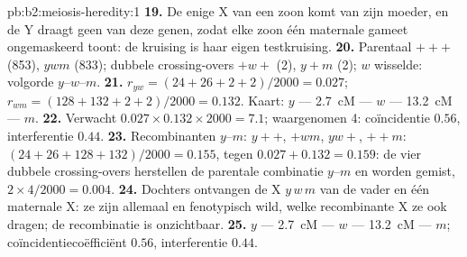 \begin{solution}{pb:b2:meiosis-heredity:1}
\textbf{19.} De enige X van een zoon komt van zijn moeder, en de Y draagt
geen van deze genen, zodat elke zoon één maternale gameet ongemaskeerd
toont: de kruising is haar eigen testkruising.
\textbf{20.} Parentaal $+++$ (853), $ywm$ (833); dubbele crossing-overs
$+w+$ (2), $y+m$ (2); $w$ wisselde: volgorde $y$--$w$--$m$.
\textbf{21.} $r_{yw} = (24 + 26 + 2 + 2)/2000 = 0.027$; $r_{wm} = (128
+ 132 + 2 + 2)/2000 = 0.132$. Kaart: $y$ --- \qty{2.7}{cM} --- $w$ ---
\qty{13.2}{cM} --- $m$.
\textbf{22.} Verwacht $0.027\times 0.132\times 2000 = 7.1$; waargenomen
4: coïncidentie $0.56$, interferentie $0.44$.
\textbf{23.} Recombinanten $y$--$m$: $y++$, $+wm$, $yw+$, $++m$: $(24 +
26 + 128 + 132)/2000 = 0.155$, tegen $0.027 + 0.132 = 0.159$: de
vier dubbele crossing-overs herstellen de parentale combinatie $y$--$m$ en
worden gemist, $2\times 4/2000 = 0.004$.
\textbf{24.} Dochters ontvangen de X $y\,w\,m$ van de vader en één
maternale X: ze zijn allemaal  en fenotypisch wild, welke
recombinante X ze ook dragen; de recombinatie is onzichtbaar.
\textbf{25.} $y$ --- \qty{2.7}{cM} --- $w$ --- \qty{13.2}{cM} --- $m$;
coïncidentiecoëfficiënt $0.56$, interferentie $0.44$.
\end{solution}
